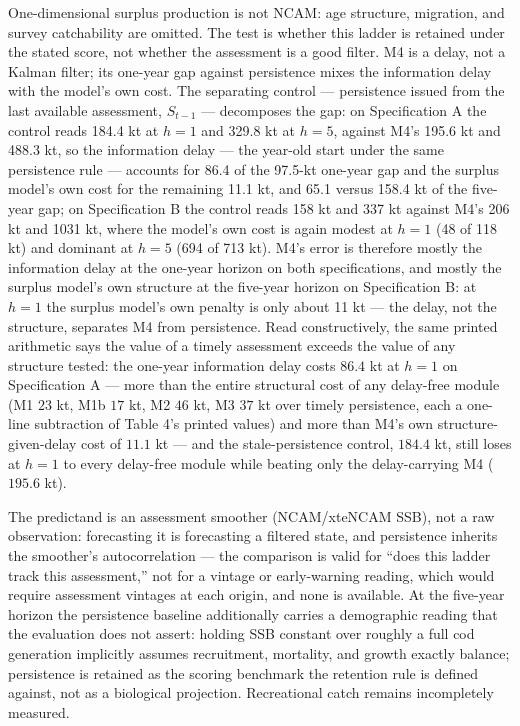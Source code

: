 \documentclass[11pt]{article}
\begin{document}
One-dimensional surplus production is not NCAM: age structure,
migration, and survey catchability are omitted. The test is whether this
ladder is retained under the stated score, not whether the assessment is
a good filter. M4 is a delay, not a Kalman filter; its one-year gap
against persistence mixes the information delay with the model's own
cost. The separating control --- persistence issued from the last
available assessment, \(S_{t-1}\) --- decomposes the gap: on
Specification A the control reads 184.4 kt at \(h = 1\) and 329.8 kt at
\(h = 5\), against M4's 195.6 kt and 488.3 kt, so the information delay
--- the year-old start under the same persistence rule --- accounts for
86.4 of the 97.5-kt one-year gap and the surplus model's own cost for
the remaining 11.1 kt, and 65.1 versus 158.4 kt of the five-year gap; on
Specification B the control reads 158 kt and 337 kt against M4's 206 kt
and 1031 kt, where the model's own cost is again modest at \(h = 1\) (48
of 118 kt) and dominant at \(h = 5\) (694 of 713 kt). M4's error is
therefore mostly the information delay at the one-year horizon on both
specifications, and mostly the surplus model's own structure at the
five-year horizon on Specification B: at \(h = 1\) the surplus model's
own penalty is only about 11 kt --- the delay, not the structure,
separates M4 from persistence. Read constructively, the same printed
arithmetic says the value of a timely assessment exceeds the value of
any structure tested: the one-year information delay costs \(86.4\) kt
at \(h = 1\) on Specification A --- more than the entire structural cost
of any delay-free module (M1 \(23\) kt, M1b \(17\) kt, M2 \(46\) kt, M3
\(37\) kt over timely persistence, each a one-line subtraction of Table
4's printed values) and more than M4's own structure-given-delay cost of
\(11.1\) kt --- and the stale-persistence control, \(184.4\) kt, still
loses at \(h = 1\) to every delay-free module while beating only the
delay-carrying M4 (\(195.6\) kt).

The predictand is an assessment smoother (NCAM/xteNCAM SSB), not a raw
observation: forecasting it is forecasting a filtered state, and
persistence inherits the smoother's autocorrelation --- the comparison
is valid for ``does this ladder track this assessment,'' not for a
vintage or early-warning reading, which would require assessment
vintages at each origin, and none is available. At the five-year horizon
the persistence baseline additionally carries a demographic reading that
the evaluation does not assert: holding SSB constant over roughly a full
cod generation implicitly assumes recruitment, mortality, and growth
exactly balance; persistence is retained as the scoring benchmark the
retention rule is defined against, not as a biological projection.
Recreational catch remains incompletely measured.
\end{document}
